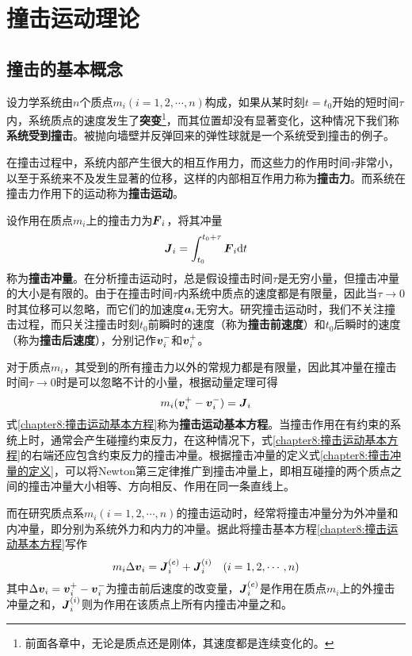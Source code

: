 \chapter{撞击运动理论}

\section{撞击的基本概念}

设力学系统由$n$个质点$m_i(i=1,2,\cdots,n)$构成，如果从某时刻$t=t_0$开始的短时间$\tau$内，系统质点的速度发生了{\bf 突变}\footnote{前面各章中，无论是质点还是刚体，其速度都是连续变化的。}，而其位置却没有显著变化，这种情况下我们称{\bf 系统受到撞击}。被抛向墙壁并反弹回来的弹性球就是一个系统受到撞击的例子。

在撞击过程中，系统内部产生很大的相互作用力，而这些力的作用时间$\tau$非常小，以至于系统来不及发生显著的位移，这样的内部相互作用力称为{\bf 撞击力}。而系统在撞击力作用下的运动称为{\bf 撞击运动}。

设作用在质点$m_i$上的撞击力为$\boldsymbol{F}_i$，将其冲量
\begin{equation}
	\boldsymbol{J}_i = \int_{t_0}^{t_0+\tau}\boldsymbol{F}_i\mathrm{d} t
	\label{chapter8:撞击冲量的定义}
\end{equation}
称为{\bf 撞击冲量}。在分析撞击运动时，总是假设撞击时间$\tau$是无穷小量，但撞击冲量的大小是有限的。由于在撞击时间$\tau$内系统中质点的速度都是有限量，因此当$\tau\to0$时其位移可以忽略，而它们的加速度$\boldsymbol{a}_i$无穷大。研究撞击运动时，我们不关注撞击过程，而只关注撞击时刻$t_0$前瞬时的速度（称为{\bf 撞击前速度}）和$t_0$后瞬时的速度（称为{\bf 撞击后速度}），分别记作$\boldsymbol{v}_i^-$和$\boldsymbol{v}_i^+$。

对于质点$m_i$，其受到的所有撞击力以外的常规力都是有限量，因此其冲量在撞击时间$\tau\to 0$时是可以忽略不计的小量，根据动量定理可得
\begin{equation}
	m_i(\boldsymbol{v}_i^+-\boldsymbol{v}_i^-) = \boldsymbol{J}_i
	\label{chapter8:撞击运动基本方程}
\end{equation}
式\eqref{chapter8:撞击运动基本方程}称为{\bf 撞击运动基本方程}。当撞击作用在有约束的系统上时，通常会产生碰撞约束反力，在这种情况下，式\eqref{chapter8:撞击运动基本方程}的右端还应包含约束反力的撞击冲量。根据撞击冲量的定义式\eqref{chapter8:撞击冲量的定义}，可以将Newton第三定律推广到撞击冲量上，即相互碰撞的两个质点之间的撞击冲量大小相等、方向相反、作用在同一条直线上。

而在研究质点系$m_i(i=1,2,\cdots,n)$的撞击运动时，经常将撞击冲量分为外冲量和内冲量，即分别为系统外力和内力的冲量。据此将撞击基本方程\eqref{chapter8:撞击运动基本方程}写作
\begin{equation}
	m_i\Delta \boldsymbol{v}_i = \boldsymbol{J}_i^{(e)}+\boldsymbol{J}_i^{(i)}\quad (i=1,2,\cdots,n)
	\label{chapter8:撞击运动基本方程2}
\end{equation}
其中$\Delta \boldsymbol{v}_i = \boldsymbol{v}_i^+-\boldsymbol{v}_i^-$为撞击前后速度的改变量，$\boldsymbol{J}_i^{(e)}$是作用在质点$m_i$上的外撞击冲量之和，$\boldsymbol{J}_i^{(i)}$则为作用在该质点上所有内撞击冲量之和。

